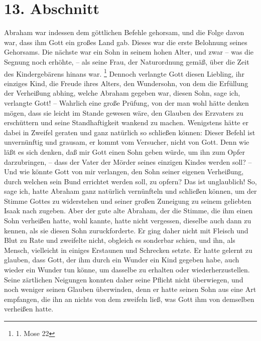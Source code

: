 \section{13. Abschnitt} \label{kap4_ab13}

Abraham  war indessen dem göttlichen Befehle gehorsam,
und die Folge davon war,
dass ihm Gott ein großes Land gab. Dieses war die erste Belohnung seines
Gehorsams. Die nächste war ein Sohn in seinem hohen Alter, und zwar -- was die
Segnung noch erhöhte, -- als seine Frau, der Naturordnung gemäß, über die Zeit
des Kindergebärens hinans war.
\footnote{1. Mose 22}
Dennoch verlangte Gott diesen
Liebling, ihr einziges Kind, die Freude ihres Alters, den Wundersohn, von dem
die Erfüllung der Verheißung abhing, welche Abraham gegeben war, diesen Sohn,
sage ich, verlangte Gott! -- Wahrlich eine große Prüfung, von der man wohl hätte
denken mögen, dass sie leicht im Stande gewesen wäre, den Glauben des Erzvaters
zu erschüttern und seine Standhaftigkeit wankend zu machen. Wenigstens hätte er
dabei in Zweifel geraten und ganz natürlich so schließen können: Dieser Befehl
ist unvernünftig und grausam, er kommt vom Versucher, nicht von Gott. Denn wie
läßt es sich denken, daß mir Gott einen Sohn geben würde, um ihn zum Opfer
darzubringen, -- dass der Vater der Mörder seines einzigen Kindes werden soll?
-- Und wie könnte Gott von mir verlangen, den Sohn seiner eigenen Verheißung,
durch welchen sein Bund errichtet werden soll, zu opfern? Das ist unglaublich!
So, sage ich, hatte Abraham ganz natürlich vernünfteln und schließen können, um
der Stimme Gottes zu widerstehen und seiner großen Zuneigung zu seinem geliebten
Isaak  nach zugeben. Aber der gute alte Abraham, der die
Stimme, die ihm einen
Sohn verheißen hatte, wohl kannte, hatte nicht vergessen, dieselbe auch dann zu
kennen, als sie diesen Sohn zuruckforderte. Er ging daher nicht mit Fleisch und
Blut zu Rate und zweifelte nicht, obgleich es sonderbar schien, und ihn, als
Mensch, vielleicht in einiges Erstaunen und Schrecken setzte. Er hatte gelernt
zu glauben, dass Gott, der ihm durch ein Wunder ein Kind gegeben habe, auch
wieder ein Wunder tun könne, um dasselbe zu erhalten oder wiederherzustellen.
Seine zärtlichen Neigungen konnten daher seine Pflicht nicht überwiegen, und
noch weniger seinen Glauben überwinden, denn er hatte seinen Sohn aus eine Art
empfangen, die ihn an nichts von dem zweifeln ließ, was Gott ihm von demselben
verheißen hatte.

\medskip

